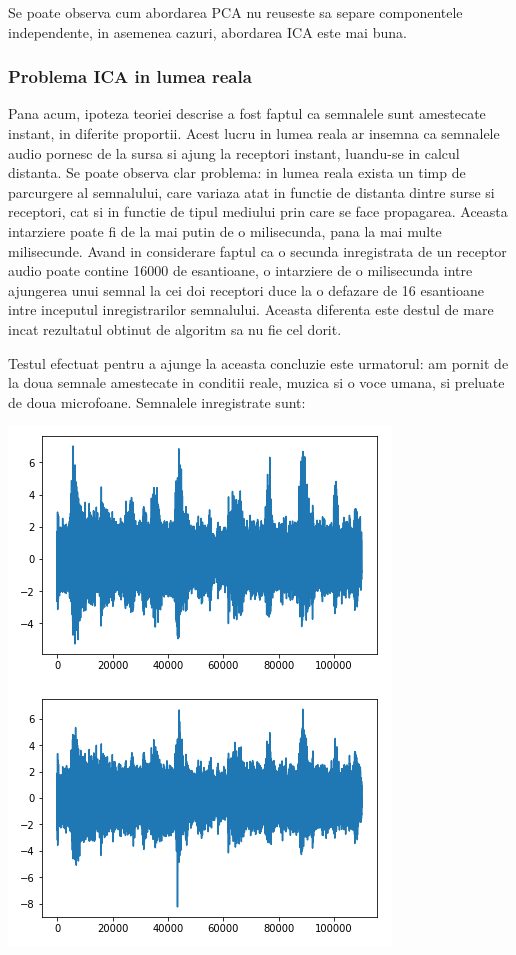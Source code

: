 \documentclass[12pt,oneside]{article}
\begin{document}
 Se poate observa cum abordarea PCA nu reuseste sa separe componentele independente, in asemenea cazuri, abordarea ICA este mai buna.

\subsubsection{Problema ICA in lumea reala}
Pana acum, ipoteza teoriei descrise a fost faptul ca semnalele sunt amestecate instant, in diferite proportii. Acest lucru in lumea reala ar insemna ca semnalele audio pornesc de la sursa si ajung la receptori instant, luandu-se in calcul distanta. Se poate observa clar problema: in lumea reala exista un timp de parcurgere al semnalului, care variaza atat in functie de distanta dintre surse si receptori, cat si in functie de tipul mediului prin care se face propagarea. Aceasta intarziere poate fi de la mai putin de o milisecunda, pana la mai multe milisecunde. Avand in considerare faptul ca o secunda inregistrata de un receptor audio poate contine 16000 de esantioane, o intarziere de o milisecunda intre ajungerea unui semnal la cei doi receptori duce la o defazare de 16 esantioane intre inceputul inregistrarilor semnalului. Aceasta diferenta este destul de mare incat rezultatul obtinut de algoritm sa nu fie cel dorit. 

Testul efectuat pentru a ajunge la aceasta concluzie este urmatorul: am pornit de la doua semnale amestecate in conditii reale, muzica si o voce umana, si preluate de doua microfoane.\cite{sound_samples_1} Semnalele inregistrate sunt:
\begin{center}
	\includegraphics[scale=1]{real_mixed}
 \end{center}
\end{document}
